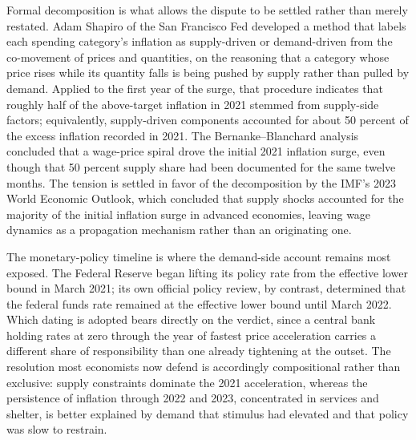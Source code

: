 \documentclass[11pt]{article}
\begin{document}
{Formal decomposition is what allows the dispute to be settled rather than merely restated. Adam Shapiro of the San Francisco Fed developed a method that labels each spending category's inflation as supply-driven or demand-driven from the co-movement of prices and quantities, on the reasoning that a category whose price rises while its quantity falls is being pushed by supply rather than pulled by demand. Applied to the first year of the surge, that procedure indicates that roughly half of the above-target inflation in 2021 stemmed from supply-side factors; equivalently, supply-driven components accounted for about 50 percent of the excess inflation recorded in 2021. The Bernanke–Blanchard analysis concluded that a wage-price spiral drove the initial 2021 inflation surge, even though that 50 percent supply share had been documented for the same twelve months. The tension is settled in favor of the decomposition by the IMF's 2023 World Economic Outlook, which concluded that supply shocks accounted for the majority of the initial inflation surge in advanced economies, leaving wage dynamics as a propagation mechanism rather than an originating one.

The monetary-policy timeline is where the demand-side account remains most exposed. The Federal Reserve began lifting its policy rate from the effective lower bound in March 2021; its own official policy review, by contrast, determined that the federal funds rate remained at the effective lower bound until March 2022. Which dating is adopted bears directly on the verdict, since a central bank holding rates at zero through the year of fastest price acceleration carries a different share of responsibility than one already tightening at the outset. The resolution most economists now defend is accordingly compositional rather than exclusive: supply constraints dominate the 2021 acceleration, whereas the persistence of inflation through 2022 and 2023, concentrated in services and shelter, is better explained by demand that stimulus had elevated and that policy was slow to restrain.}
\end{document}
